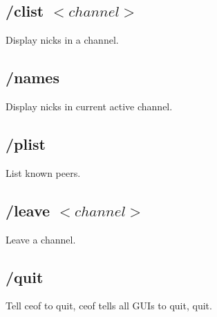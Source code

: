 \documentclass[12pt,a4paper]{article}
\begin{document}
\subsection{/clist $<channel>$}
Display nicks in a channel.

\subsection{/names}
Display nicks in current active channel.

\subsection{/plist}
List known peers.

\subsection{/leave $<channel>$}
Leave a channel.

\subsection{/quit}
Tell ceof to quit, ceof tells all GUIs to quit, quit.
\end{document}
